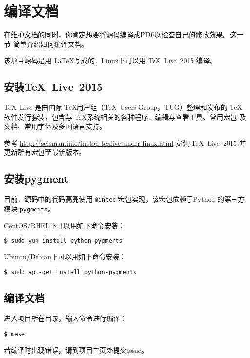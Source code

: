 \section{编译文档}
在维护文档的同时，你肯定想要将源码编译成PDF以检查自己的修改效果。这一节
简单介绍如何编译文档。

该项目源码是用 \LaTeX 写成的，Linux下可以用 \TeX~Live~2015 编译。

\subsection{安装\TeX~Live~2015}
\TeX~Live 是由国际 \TeX 用户组（\TeX~Users Group，TUG）整理和发布的 \TeX
软件发行套装，包含与 \TeX 系统相关的各种程序、编辑与查看工具、常用宏包
及文档、常用字体及多国语言支持。

参考 \url{http://seisman.info/install-texlive-under-linux.html} 安装
TeX~Live~2015 并更新所有宏包至最新版本。

\subsection{安装pygment}
目前，源码中的代码高亮使用 \texttt{minted} 宏包实现，该宏包依赖于Python
的第三方模块 \texttt{pygments}。

CentOS/RHEL下可以用如下命令安装：
\begin{verbatim}
$ sudo yum install python-pygments
\end{verbatim}

Ubuntu/Debian下可以用如下命令安装：
\begin{verbatim}
$ sudo apt-get install python-pygments
\end{verbatim}

\subsection{编译文档}
进入项目所在目录，输入命令进行编译：
\begin{verbatim}
$ make
\end{verbatim}
若编译时出现错误，请到项目主页处提交Issue。
